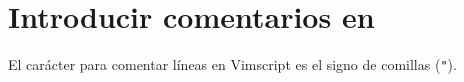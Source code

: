 \section{Introducir comentarios en }\label{sec:vim-comments}
El carácter para comentar líneas en Vimscript es el signo de comillas (\lstinline+"+).
